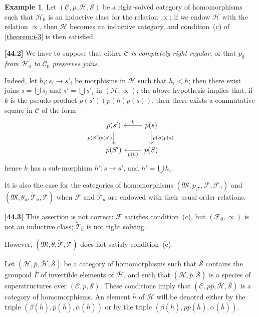 \documentclass[a4paper,fleqn]{article}
\theoremstyle{plain}
\theoremstyle{definition}
\newtheorem*{example}{Example}
\newenvironment{longcomm}[1]
  {\noindent\textbf{[#1]}\rmfamily}
  {}
\newcommand{\oldpage}[1]{{\marginpar{\footnotesize$\bigg\vert$\,\,\,\,\textit{p.~#1}}}}
\newcommand{\CC}{\mathcal{C}}
\newcommand{\HH}{\mathcal{H}}
\newcommand{\bHH}{\overline{\HH}}
\renewcommand{\SS}{\mathcal{S}}
\newcommand{\bSS}{\overline{\SS}}
\newcommand{\MM}{\mathfrak{M}}
\newcommand{\FF}{\mathcal{F}}
\newcommand{\TT}{\mathcal{T}}
\newcommand{\tTT}{\widetilde{\TT}}
\newcommand{\subs}{\mathrel{\propto}}
\begin{document}
\begin{example}
  Let $(\CC,p,\HH,\SS)$ be a right-solved category of homomorphisms such that $\HH_0$ is an inductive class \cite{3a} for the relation $\subs$;
  if we endow $\HH$ with the relation $\subs$, then $\HH$ becomes an inductive category, and condition~(c) of \cref{theorem:i-3} is then satisfied.

  \begin{longcomm}{44.2}
    We have to suppose that either \emph{$\CC$ is completely right regular}, or that \emph{$p_0$ from $\HH_0$ to $\CC_0$ preserves joins}.

    Indeed, let $h_i\colon s_i\to s'_i$ be morphisms in $\HH$ such that $h_i<h$;
    then there exist joins $s=\bigcup s_i$ and $s'=\bigcup s'_i$ in $(\HH,\subs)$;
    the above hypothesis implies that, if $k$ is the pseudo-product $p(s')(p(h)p(s))$, then there exists a commutative square in $\CC$ of the form
    \[
      \begin{tikzcd}
        p(s')
          \ar[d,swap,"p(S')p(s')"]
        & p(s)
          \ar[l,swap,"k"]
          \ar[d,"p(S)p(s)"]
      \\p(S')
        & p(S)
          \ar[l,"p(h)"]
      \end{tikzcd}
    \]
    hence $h$ has a sub-morphism $h'\colon s\to s'$, and $h'=\bigcup h_i$.
  \end{longcomm}

  It is also the case for the categories of homomorphisms $(\MM,p_\FF,\FF,\FF_\gamma)$ and $(\MM,\theta_u,\tTT_u,\TT)$ when $\FF$ and $\tTT_u$ are endowed with their usual order relations.

  \begin{longcomm}{44.3}
    This assertion is not correct: $\FF$ satisfies condition~(c), but $(\FF_0,\subs)$ is not an inductive class; $\tTT_u$ is not right solving.
  \end{longcomm}

  However, $(\MM,\theta,\tTT,\TT)$ does not satisfy condition~(c).
\end{example}

Let $(\HH,\overline{p},\bHH,\bSS)$ be a category of homomorphisms such that $\bSS$ contains the groupoid $\overline{\Gamma}$ of invertible elements of $\bHH$, and such that $(\HH,\overline{p},\bSS)$ is a species of superstructures \cite{3a} over $(\CC,p,\SS)$.
\oldpage{373}
These conditions imply that $(\CC,p\overline{p},\bHH,\bSS)$ is a category of homomorphisms.
An element $\overline{h}$ of $\bHH$ will be denoted either by the triple $(\beta(\overline{h}),\overline{p}(\overline{h}),\alpha(\overline{h}))$ or by the triple $(\beta(\overline{h}),p\overline{p}(\overline{h}),\alpha(\overline{h}))$.
\end{document}
